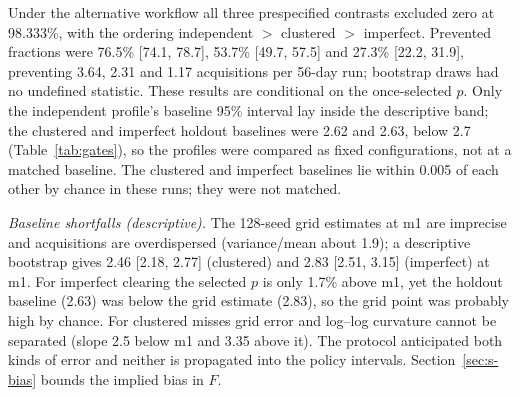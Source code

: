 Under the alternative workflow all three prespecified contrasts excluded zero at
98.333\%, with the ordering independent $>$ clustered $>$ imperfect. Prevented
fractions were 76.5\% [74.1, 78.7], 53.7\% [49.7, 57.5] and 27.3\% [22.2, 31.9],
preventing 3.64, 2.31 and 1.17 acquisitions per 56-day run; bootstrap draws had
no undefined statistic. These results are conditional on the once-selected $p$.
Only the independent profile's baseline 95\% interval lay inside the descriptive
band; the clustered and imperfect holdout baselines were 2.62 and 2.63, below
2.7 (Table~\ref{tab:gates}), so the profiles were compared as fixed
configurations, not at a matched baseline. The clustered and imperfect
baselines lie within 0.005 of each other by chance in
these runs; they were not matched.

\emph{Baseline shortfalls (descriptive).} The 128-seed grid
estimates at m1 are imprecise and acquisitions are overdispersed (variance/mean
about 1.9); a descriptive bootstrap gives 2.46 [2.18, 2.77] (clustered) and 2.83
[2.51, 3.15] (imperfect) at m1. For imperfect clearing the selected $p$ is only
1.7\% above m1, yet the holdout baseline (2.63) was below the grid estimate
(2.83), so the grid point was probably high by chance. For clustered misses
grid error and log--log curvature cannot be separated (slope 2.5 below m1 and
3.35 above it). The protocol anticipated both kinds of error and neither is
propagated into the policy intervals. Section~\ref{sec:s-bias} bounds the
implied bias in $F$.

